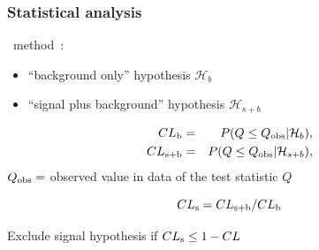 \begin{frame}\frametitle{Statistical analysis}
\centering\myskip\scriptsize


\ method~\cite{cls,cls_2}:

\begin{itemize}
\item ``background only'' hypothesis $\mathcal{H}_{b}$
\item ``signal plus background'' hypothesis $\mathcal{H}_{s+b}$ 
\end{itemize}

\begin{eqnarray*}
\cls{b} &=& P(Q \leq Q_{\rm obs}|\mathcal{H}_{b}),\\
\cls{s+b} &=& P(Q \leq Q_{\rm obs}|\mathcal{H}_{s+b}),
\end{eqnarray*}
$Q_{\rm obs} = $ observed value in data of the 
test statistic $Q$

$$\cls{s} = \cls{s+b}/\cls{b}$$


{\cccolor Exclude} signal hypothesis if $\cls{s} \leq 1 - CL$ 




\end{frame}
